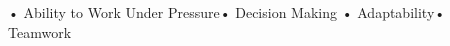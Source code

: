  • Ability to Work Under Pressure\newline  • Decision Making \newline  • Adaptability\newline  • Teamwork











